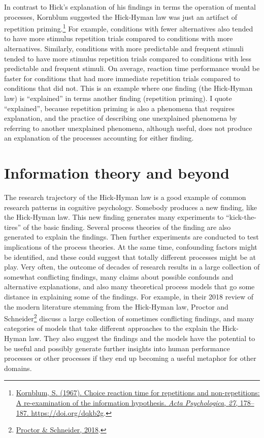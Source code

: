 \documentclass[
  oneside,
  12pt]{crumpbook}
\begin{document}
In contrast to Hick's explanation of his findings in terms the operation of mental processes, Kornblum suggested the Hick-Hyman law was just an artifact of repetition priming.\footnote{\protect\hyperlink{ref-kornblumChoiceReactionTime1967}{Kornblum, S. (1967). Choice reaction time for repetitions and non-repetitions: {A} re-examination of the information hypothesis. \emph{Acta Psychologica}, \emph{27}, 178--187. \url{https://doi.org/dqkb2g}}.} For example, conditions with fewer alternatives also tended to have more stimulus repetition trials compared to conditions with more alternatives. Similarly, conditions with more predictable and frequent stimuli tended to have more stimulus repetition trials compared to conditions with less predictable and frequent stimuli. On average, reaction time performance would be faster for conditions that had more immediate repetition trials compared to conditions that did not. This is an example where one finding (the Hick-Hyman law) is ``explained'' in terms another finding (repetition priming). I quote ``explained'', because repetition priming is also a phenomena that requires explanation, and the practice of describing one unexplained phenomena by referring to another unexplained phenomena, although useful, does not produce an explanation of the processes accounting for either finding.

\hypertarget{information-theory-and-beyond}{%
\section{Information theory and beyond}\label{information-theory-and-beyond}}

The research trajectory of the Hick-Hyman law is a good example of common research patterns in cognitive psychology. Somebody produces a new finding, like the Hick-Hyman law. This new finding generates many experiments to ``kick-the-tires'' of the basic finding. Several process theories of the finding are also generated to explain the findings. Then further experiments are conducted to test implications of the process theories. At the same time, confounding factors might be identified, and these could suggest that totally different processes might be at play. Very often, the outcome of decades of research results in a large collection of somewhat conflicting findings, many claims about possible confounds and alternative explanations, and also many theoretical process models that go some distance in explaining some of the findings. For example, in their 2018 review of the modern literature stemming from the Hick-Hyman law, Proctor and Schneider\footnote{\protect\hyperlink{ref-proctorHickLawChoice2018}{Proctor \& Schneider, 2018}.} discuss a large collection of sometimes conflicting findings, and many categories of models that take different approaches to the explain the Hick-Hyman law. They also suggest the findings and the models have the potential to be useful and possibly generate further insights into human performance processes or other processes if they end up becoming a useful metaphor for other domains.
\end{document}
